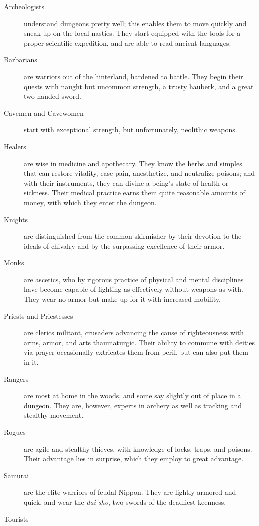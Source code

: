 \documentclass[titlepage]{article}
\begin{document}
%
\begin{description}
\item[Archeologists]
understand dungeons pretty well; this enables them
to move quickly and sneak up on the local nasties.  They start equipped
with the tools for a proper scientific expedition, and are able to read
ancient languages.
%
\item[Barbarians]
are warriors out of the hinterland, hardened to battle.
They begin their quests with naught but uncommon strength, a trusty hauberk,
and a great two-handed sword.
%
\item[Cavemen \textrm{\textmd{and}} Cavewomen]
start with exceptional strength, but unfortunately, neolithic weapons.
%
\item[Healers]
are wise in medicine and apothecary.  They know the
herbs and simples that can restore vitality, ease pain, anesthetize,
and neutralize
poisons; and with their instruments, they can divine a being's state
of health or sickness.  Their medical practice earns them quite reasonable
amounts of money, with which they enter the dungeon.
%
\item[Knights]
are distinguished from the common skirmisher by their
devotion to the ideals of chivalry and by the surpassing excellence of
their armor.
%
\item[Monks]
are ascetics, who by rigorous practice of physical and mental
disciplines have become capable of fighting as effectively without weapons
as with.  They wear no armor but make up for it with increased mobility.
%
\item[Priests \textrm{\textmd{and}} Priestesses]
are clerics militant, crusaders
advancing the cause of righteousness with arms, armor, and arts
thaumaturgic.  Their ability to commune with deities via prayer
occasionally extricates them from peril, but can also put them in it.
%
\item[Rangers]
are most at home in the woods, and some say slightly out
of place in a dungeon.  They are, however, experts in archery as well
as tracking and stealthy movement.
%
\item[Rogues]
are agile and stealthy thieves, with knowledge of locks,
traps, and poisons.  Their advantage lies in surprise, which they employ
to great advantage.
%
\item[Samurai]
are the elite warriors of feudal Nippon.  They are lightly
armored and quick, and wear the %
\textit{dai-sho}, two swords of the deadliest
keenness.
%
\item[Tourists]

\end{description}
\end{document}
